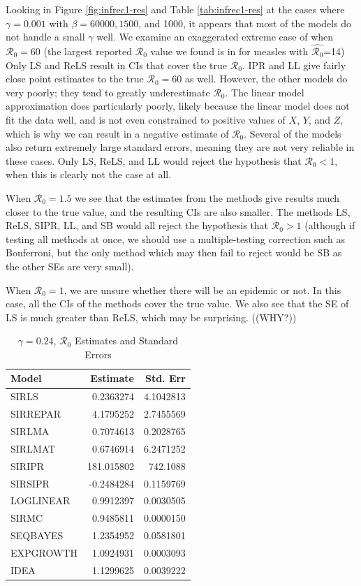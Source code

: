 \documentclass[12pt]{article}
\newcommand{\rr}{\ensuremath{\mathcal{R}_0}}
\begin{document}
Looking in Figure \ref{fig:infrec1-res} and Table \ref{tab:infrec1-res} at the cases where $\gamma = 0.001$ with $\beta=60000, 1500$, and 1000, it appears that most of the models do not handle a small $\gamma$ well.  We examine an exaggerated extreme case of when $\rr=60$ (the largest reported $\rr$ value we found is in \cite{anderson1992} for measles with $\hat{\rr}$=14) Only LS and ReLS result in CIs that cover the true $\rr$. IPR and LL give fairly close point estimates to the true $\rr=60$ as well. However, the other models do very poorly; they tend to greatly underestimate $\rr$. The linear model approximation does particularly poorly, likely because the linear model does not fit the data well, and is not even constrained to positive values of $X$, $Y$, and $Z$, which is why we can result in a negative estimate of $\rr$. Several of the models also return extremely large standard errors, meaning they are not very reliable in these cases.  Only LS, ReLS, and LL would reject the hypothesis that $\rr <1$, when this is clearly not the case at all.

When $\rr=1.5$ we see that the estimates from the methods give results much closer to the true value, and the resulting CIs are also smaller.  The methods LS, ReLS, SIPR, LL, and SB would all reject the hypothesis that $\rr > 1$ (although if testing all methods at once, we should use a multiple-testing correction such as Bonferroni, but the only method which may then fail to reject would be SB as the other SEs are very small).

When $\rr=1$, we are unsure whether there will be an epidemic or not.  In this case, all the CIs of the methods cover the true value.  We also see that the SE of LS is much greater than ReLS, which may be surprising. ((WHY?))

\begin{table}[H]

	\centering
	\begin{tabular}[t]{l|r|r}
		\hline
		Model & Estimate & Std. Err\\
		\hline
		SIRLS & 0.2363274 & 4.1042813\\
		\hline
		SIRREPAR & 4.1795252 & 2.7455569\\
		\hline
		SIRLMA &  0.7074613 & 0.2028765 \\
		\hline
		SIRLMAT & 0.6746914 & 6.2471252 \\
		\hline
		SIRIPR & 181.015802 & 742.1088 \\
		\hline
		SIRSIPR & -0.2484284 & 0.1159769 \\
		\hline
		LOGLINEAR & 0.9912397 & 0.0030505\\
		\hline
		SIRMC & 0.9485811 & 0.0000150\\
		\hline
		SEQBAYES & 1.2354952 & 0.0581801\\
		\hline
		EXPGROWTH & 1.0924931 & 0.0003093\\
		\hline
		IDEA & 1.1299625 & 0.0039222\\
		\hline
	\end{tabular}
        \caption{$\gamma = 0.24$, $\rr$ Estimates and Standard Errors}\label{tab:infrec4-res}
\end{table}
\end{document}
